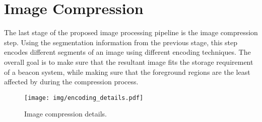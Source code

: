 







\section{Image Compression}
\label{sec:algo_icomp}

The last stage of the proposed image processing pipeline is the image compression step. Using the segmentation information from the previous stage, this step encodes different segments of an image using different encoding techniques. The overall goal is to make sure that the resultant image fits the storage requirement of a beacon system, while making sure that the foreground regions are the least affected by during the compression process.




\begin{figure}[!thb]
    \begin{center}
	    \texttt{[image: img/encoding\_details.pdf]}
	    \caption{\footnotesize Image compression details.}
	    \label{fig:block}
    \end{center}
\end{figure}




